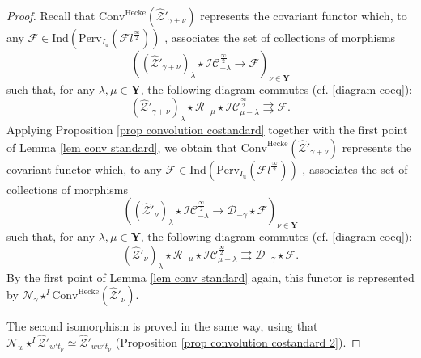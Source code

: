 \documentclass[10pt,a4paper]{amsart}
\begin{document}
\begin{proof}
   Recall that  $\mathrm{Conv}^{\mathrm{Hecke}}(\widehat{\mathcal{Z}}'_{\gamma+\nu})$ represents the covariant functor which, to any $\mathcal{F}\in \mathrm{Ind}(\mathrm{Perv}_{{I_\mathrm{u}}}(\mathcal{F}l^{\frac{\infty}{2}}))$ , associates the set of collections of morphisms $$((\widehat{\mathcal{Z}}'_{\gamma+\nu})_\lambda\star\mathcal{IC}^{\frac{\infty}{2}}_{-\lambda}\to \mathcal{F})_{\nu\in\mathbf{Y}}$$ such that, for any $\lambda,\mu\in\mathbf{Y}$, the following diagram commutes (cf. \eqref{diagram coeq}):
	\begin{equation*}
		(\widehat{\mathcal{Z}}'_{\gamma+\nu})_\lambda\star\mathcal{R}_{-\mu}\star\mathcal{IC}^{\frac{\infty}{2}}_{\mu-\lambda}\rightrightarrows\mathcal{F}. 
	\end{equation*} 
 Applying Proposition \ref{prop convolution costandard} together with the first point of Lemma \ref{lem conv standard}, we obtain that $\mathrm{Conv}^{\mathrm{Hecke}}(\widehat{\mathcal{Z}}'_{\gamma+\nu})$ represents the covariant functor which, to any $\mathcal{F}\in \mathrm{Ind}(\mathrm{Perv}_{{I_\mathrm{u}}}(\mathcal{F}l^{\frac{\infty}{2}}))$ , associates the set of collections of morphisms $$((\widehat{\mathcal{Z}}'_{\nu})_\lambda\star\mathcal{IC}^{\frac{\infty}{2}}_{-\lambda}\to \mathcal{D}_{-\gamma}\star\mathcal{F})_{\nu\in\mathbf{Y}}$$ such that, for any $\lambda,\mu\in\mathbf{Y}$, the following diagram commutes (cf. \eqref{diagram coeq}):
	\begin{equation*}
		(\widehat{\mathcal{Z}}'_{\nu})_\lambda\star\mathcal{R}_{-\mu}\star\mathcal{IC}^{\frac{\infty}{2}}_{\mu-\lambda}\rightrightarrows\mathcal{D}_{-\gamma}\star\mathcal{F}. 
	\end{equation*} 
 By the first point of Lemma \ref{lem conv standard} again, this functor is represented by $ \mathcal{N}_\gamma\star^I\mathrm{Conv}^{\mathrm{Hecke}}(\widehat{\mathcal{Z}}'_\nu)$.

  The second isomorphism is proved in the same way, using that $\mathcal{N}_w\star^I\widehat{\mathcal{Z}}'_{w't_\nu}\simeq \widehat{\mathcal{Z}}'_{ww't_\nu}$ (Proposition \ref{prop convolution costandard 2}). 
\end{proof}
\end{document}

